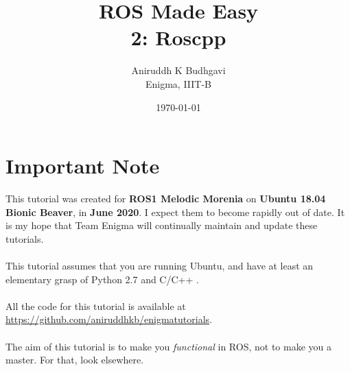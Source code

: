 \documentclass{article}
\title{ROS Made Easy \\2: Roscpp}
\date{\today}
\author{Aniruddh K Budhgavi \\Enigma, IIIT-B}
\begin{document}
    \maketitle
    \section{Important Note}
    This tutorial was created for \textbf{ROS1 Melodic Morenia}
    on \textbf{Ubuntu 18.04 Bionic Beaver}, in \textbf{June 2020}.
    I expect them to become rapidly out of date. It is my hope
    that Team Enigma will continually maintain and update these tutorials.
    \\
    \\
    This tutorial assumes that you are running Ubuntu, and have at least an
    elementary grasp of Python 2.7 and C/C++ .
    \\
    \\
    All the code for this tutorial is available at \url{https://github.com/aniruddhkb/enigmatutorials}.
    \\
    \\
    The aim of this tutorial is to make you \emph{functional} in ROS, not to make you a master. For 
    that, look elsewhere.
\end{document}
